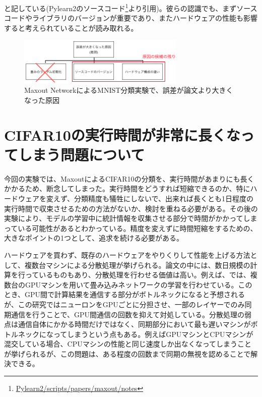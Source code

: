 と記している(Pylearn2のソースコード\footnote{\url{Pylearn2/scripts/papers/maxout/notes}}より引用)。彼らの認識でも、まずソースコードやライブラリのバージョンが重要であり、またハードウェアの性能も影響すると考えられていることが読み取れる。\par
\begin{figure}[tbp]
 \begin{center}
  \includegraphics[width=80mm]{img/c6/maxout_error_cause}
 \end{center}
 \caption{Maxout NetworkによるMNIST分類実験で、誤差が論文より大きくなった原因}
 \label{c6_maxout_cause}
\end{figure}
\section{CIFAR10の実行時間が非常に長くなってしまう問題について}
今回の実験では、MaxoutによるCIFAR10の分類を、実行時間があまりにも長くかかるため、断念してしまった。実行時間をどうすれば短縮できるのか、特にハードウェアを変えず、分類精度も犠牲にしないで、出来れば長くとも1日程度の実行時間で収束させるための方法がないか、検討を重ねる必要がある。その後の実験により、モデルの学習中に統計情報を収集させる部分で時間がかかってしまっている可能性があるとわかっている。精度を変えずに時間短縮をするための、大きなポイントの1つとして、追求を続ける必要がある。\par
ハードウェアを買わず、既存のハードウェアをやりくりして性能を上げる方法として、複数台マシンによる分散処理が挙げられる。論文の中には、数日規模の計算を行っているものもあり、分散処理を行わせる価値は高い。例えば、\cite{krizhevsky2012imagenet}では、複数台のGPUマシンを用いて畳み込みネットワークの学習を行わせている。このとき、GPU間で計算結果を通信する部分がボトルネックになると予想されるが、この研究ではニューロンをGPUごとに分担させ、一部のレイヤーでのみ同期通信を行うことで、GPU間通信の回数を抑えて対処している。分散処理の弱点は通信自体にかかる時間だけではなく、同期部分において最も遅いマシンがボトルネックになってしまうという点もある。例えばGPUマシンとCPUマシンが混交している場合、CPUマシンの性能と同じ速度しか出なくなってしまうことが挙げられるが、この問題は、ある程度の回数まで同期の無視を認めることで解決できる\cite{ho2013more}。


